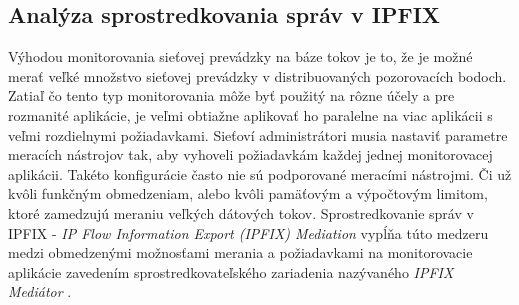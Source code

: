 \subsection{Anal\'yza sprostredkovania spr\'av v IPFIX}

Výhodou monitorovania sieťovej prevádzky na báze tokov je to, že je možné merať 
veľké množstvo sieťovej prevádzky v distribuovaných pozorovacích bodoch. 
Zatiaľ čo tento typ monitorovania môže byť použitý na rôzne účely a pre rozmanité aplikácie, je veľmi 
obtiažne aplikovať ho paralelne na viac aplikácii s veľmi rozdielnymi požiadavkami.
Sieťoví administrátori musia nastaviť parametre meracích nástrojov tak, aby vyhoveli požiadavkám každej
jednej monitorovacej aplikácii. Takéto konfigurácie často nie sú podporované meracími nástrojmi. Či už
kvôli funkčným obmedzeniam, alebo kvôli pamäťovým a výpočtovým limitom, ktoré zamedzujú meraniu veľkých 
dátových tokov. Sprostredkovanie správ v IPFIX - \emph{IP Flow Information Export (IPFIX) Mediation}
vypĺňa túto medzeru medzi obmedzenými možnosťami merania a požiadavkami na monitorovacie aplikácie 
zavedením sprostredkovateľského zariadenia nazývaného \emph{IPFIX Mediátor} \citep{rfc5982}.

